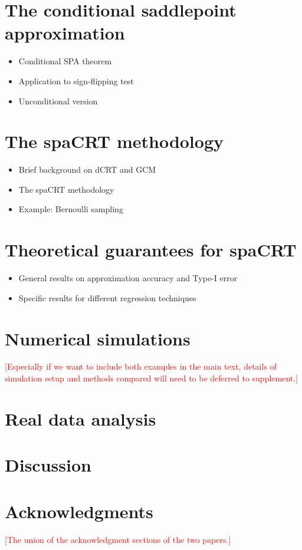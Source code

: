 \documentclass[12pt]{article}
\theoremstyle{definition}
\begin{document}
\section{The conditional saddlepoint approximation}

\begin{itemize}
  \item Conditional SPA theorem
  \item Application to sign-flipping test
  \item Unconditional version
\end{itemize}

\section{The spaCRT methodology}

\begin{itemize}
  \item Brief background on dCRT and GCM
  \item The spaCRT methodology
  \item Example: Bernoulli sampling
\end{itemize}

\section{Theoretical guarantees for spaCRT}

\begin{itemize}
  \item General results on approximation accuracy and Type-I error
  \item Specific results for different regression techniques
\end{itemize}

\section{Numerical simulations}

\noindent \textcolor{red}{[Especially if we want to include both examples in the main text, details of simulation setup and methods compared will need to be deferred to supplement.]}

\section{Real data analysis}

\section{Discussion}

\section{Acknowledgments}

\noindent \textcolor{red}{[The union of the acknowledgment sections of the two papers.]}
\end{document}
